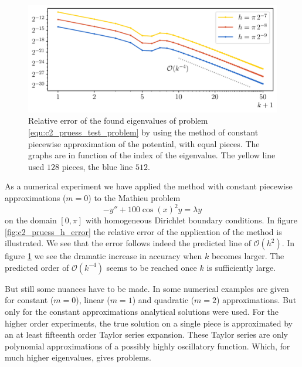 \begin{figure}
    \begin{center}
        \includegraphics[width=\textwidth]{img/chapter2/pruess_k_error.pdf}
    \end{center}
    \caption{Relative error of the found eigenvalues of problem \eqref{equ:c2_pruess_test_problem} by using the method of constant piecewise approximation of the potential, with equal pieces. The graphs are in function of the index of the eigenvalue. The yellow line used $128$ pieces, the blue line $512$.}
    \label{fig:c2_pruess_k_error}
\end{figure}

As a numerical experiment we have applied the method with constant piecewise approximations ($m=0$) to the Mathieu problem
\begin{equation}\label{equ:c2_pruess_test_problem}
-y'' + 100 \cos(x)^2 y = \lambda y
\end{equation}
on the domain $[0, \pi]$ with homogeneous Dirichlet boundary conditions. In figure \ref{fig:c2_pruess_h_error} the relative error of the application of the method is illustrated. We see that the error follows indeed the predicted line of $\mathcal{O}(h^2)$. In figure \ref{fig:c2_pruess_k_error} we see the dramatic increase in accuracy when $k$ becomes larger. The predicted order of $\mathcal{O}(k^{-4})$ seems to be reached once $k$ is sufficiently large.


But still some nuances have to be made. In \cite{pruess_estimating_1973} some numerical examples are given for constant ($m=0$), linear ($m=1$) and quadratic ($m=2$) approximations. But only for the constant approximations analytical solutions were used. For the higher order experiments, the true solution on a single piece is approximated by an at least fifteenth order Taylor series expansion. These Taylor series are only polynomial approximations of a possibly highly oscillatory function. Which, for much higher eigenvalues, gives problems.

